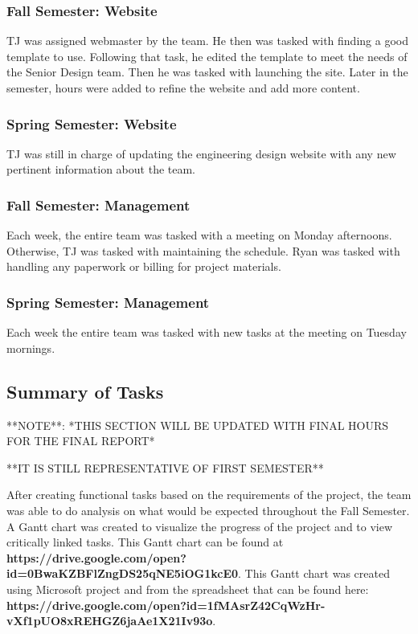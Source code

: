 \documentclass[PPFS.tex]{template/subfiles}
\begin{document}
\subsubsection{Fall Semester: Website}
TJ was assigned webmaster by the team. He then was tasked with finding a good template to use. Following that task, he edited the template to meet the needs of the Senior Design team. Then he was tasked with launching the site. Later in the semester, hours were added to refine the website and add more content.

\subsubsection{Spring Semester: Website}
TJ was still in charge of updating the engineering design website with any new pertinent information about the team.

\subsubsection{Fall Semester: Management}
Each week, the entire team was tasked with a meeting on Monday afternoons. Otherwise, TJ was tasked with maintaining the schedule. Ryan was tasked with handling any paperwork or billing for project materials.

\subsubsection{Spring Semester: Management}
Each week the entire team was tasked with new tasks at the meeting on Tuesday mornings.


\subsection{Summary of Tasks}

**NOTE**: *THIS SECTION WILL BE UPDATED WITH FINAL HOURS FOR THE FINAL REPORT*

**IT IS STILL REPRESENTATIVE OF FIRST SEMESTER**

After creating functional tasks based on the requirements of the project, the team was able to do analysis on what would be expected throughout the Fall Semester. A Gantt chart was created to visualize the progress of the project and to view critically linked tasks.
This Gantt chart can be found at \textbf{https://drive.google.com/open?id=0BwaKZBFlZngDS25qNE5iOG1kcE0}. This Gantt chart was created using Microsoft project and from the spreadsheet that can be found here:\\ \textbf{https://drive.google.com/open?id=1fMAsrZ42CqWzHr-vXf1pUO8xREHGZ6jaAe1X21Iv93o}. %
\end{document}
